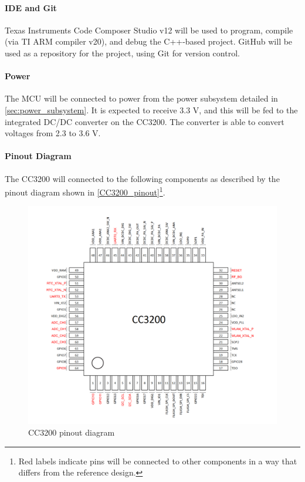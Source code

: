 \paragraph{IDE and Git}
Texas Instruments Code Composer Studio v12 will be used to program,
compile (via TI ARM compiler v20), and debug the C++-based project. GitHub
will be used as a repository for the project, using Git for version
control.

\paragraph{Power}
The MCU will be connected to power from the power subsystem detailed in 
\autoref{sec:power_subsystem}. It is expected to receive 3.3 V, and this will
be fed to the integrated DC/DC converter on the CC3200. The converter is able
to convert voltages from 2.3 to 3.6 V.

\paragraph{Pinout Diagram}
The CC3200 will connected to the following components as described by the
pinout diagram shown in \autoref{CC3200_pinout}\footnote{Red labels indicate pins will be connected to other components in a way that differs from the reference design.}.
\begin{figure}[H]
    \caption{CC3200 pinout diagram}
    \label{CC3200_pinout}
    \centering
    \includegraphics[width=\textwidth]{images/CC3200_pinout.png}
\end{figure}

